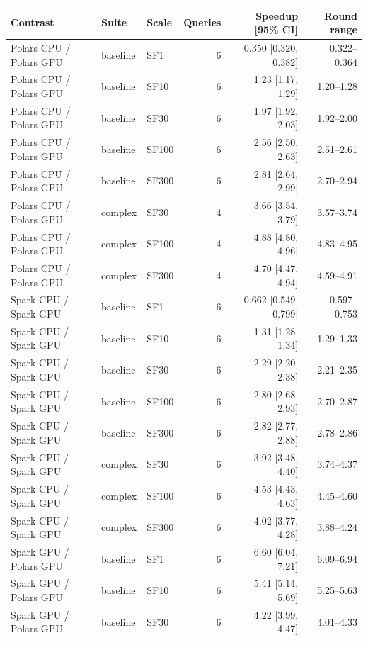 \begin{tabular}{lllrrr}
\toprule
Contrast & Suite & Scale & Queries & Speedup [95\% CI] & Round range \\
\midrule
Polars CPU / Polars GPU & baseline & SF1 & 6 & 0.350 [0.320, 0.382] & 0.322--0.364 \\
Polars CPU / Polars GPU & baseline & SF10 & 6 & 1.23 [1.17, 1.29] & 1.20--1.28 \\
Polars CPU / Polars GPU & baseline & SF30 & 6 & 1.97 [1.92, 2.03] & 1.92--2.00 \\
Polars CPU / Polars GPU & baseline & SF100 & 6 & 2.56 [2.50, 2.63] & 2.51--2.61 \\
Polars CPU / Polars GPU & baseline & SF300 & 6 & 2.81 [2.64, 2.99] & 2.70--2.94 \\
Polars CPU / Polars GPU & complex & SF30 & 4 & 3.66 [3.54, 3.79] & 3.57--3.74 \\
Polars CPU / Polars GPU & complex & SF100 & 4 & 4.88 [4.80, 4.96] & 4.83--4.95 \\
Polars CPU / Polars GPU & complex & SF300 & 4 & 4.70 [4.47, 4.94] & 4.59--4.91 \\
Spark CPU / Spark GPU & baseline & SF1 & 6 & 0.662 [0.549, 0.799] & 0.597--0.753 \\
Spark CPU / Spark GPU & baseline & SF10 & 6 & 1.31 [1.28, 1.34] & 1.29--1.33 \\
Spark CPU / Spark GPU & baseline & SF30 & 6 & 2.29 [2.20, 2.38] & 2.21--2.35 \\
Spark CPU / Spark GPU & baseline & SF100 & 6 & 2.80 [2.68, 2.93] & 2.70--2.87 \\
Spark CPU / Spark GPU & baseline & SF300 & 6 & 2.82 [2.77, 2.88] & 2.78--2.86 \\
Spark CPU / Spark GPU & complex & SF30 & 6 & 3.92 [3.48, 4.40] & 3.74--4.37 \\
Spark CPU / Spark GPU & complex & SF100 & 6 & 4.53 [4.43, 4.63] & 4.45--4.60 \\
Spark CPU / Spark GPU & complex & SF300 & 6 & 4.02 [3.77, 4.28] & 3.88--4.24 \\
Spark GPU / Polars GPU & baseline & SF1 & 6 & 6.60 [6.04, 7.21] & 6.09--6.94 \\
Spark GPU / Polars GPU & baseline & SF10 & 6 & 5.41 [5.14, 5.69] & 5.25--5.63 \\
Spark GPU / Polars GPU & baseline & SF30 & 6 & 4.22 [3.99, 4.47] & 4.01--4.33 \\

\end{tabular}
